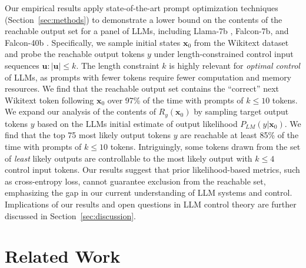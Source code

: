 \documentclass{article} %
\begin{document}
Our empirical results apply state-of-the-art prompt optimization techniques (Section~\ref{sec:methods}) to demonstrate a lower bound on the contents of the reachable output set for a panel of LLMs, including Llama-7b \citep{llama_1}, Falcon-7b, and Falcon-40b \citep{falcon40b}.
Specifically, we sample initial states $\mathbf x_0$ from the Wikitext dataset \citep{wikitext} and probe the reachable output tokens $y$ under length-constrained control input sequences $\mathbf u: |\mathbf u| \leq k$. 
The length constraint $k$ is highly relevant for \textit{optimal control} of LLMs, as prompts with fewer tokens require fewer computation and memory resources. 
We find that the reachable output set contains the ``correct'' next Wikitext token following $\mathbf x_0$ over 97\% of the time with prompts of $k\leq 10$ tokens. We expand our analysis of the contents of $R_y(\mathbf x_0)$ by sampling target output tokens $y$ based on the LLMs initial estimate of output likelihood $P_{LM}(y | \mathbf x_0)$. 
We find that the top 75 most likely output tokens $y$ are reachable at least 85\% of the time with prompts of $k\leq 10$ tokens. 
Intriguingly, some tokens drawn from the set of \textit{least} likely outputs are controllable to the most likely output with $k\leq 4$ control input tokens. 
Our results suggest that prior likelihood-based metrics, such as cross-entropy loss, cannot guarantee exclusion from the reachable set, emphasizing the gap in our current understanding of LLM systems and control. Implications of our results and open questions in LLM control theory are further discussed in Section~\ref{sec:discussion}.

\section{Related Work}

\end{document}
